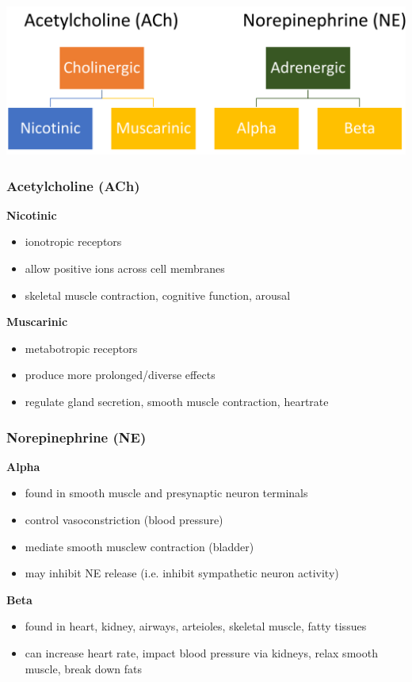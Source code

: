 \documentclass[11pt,fleqn]{book} %
\begin{document}
\begin{center}
    \includegraphics[width=0.65\linewidth]{Pictures/Screenshot 2024-03-06 204921.png}
\end{center}

\subsubsection{Acetylcholine (ACh)}

\textbf{Nicotinic}
\begin{itemize}
    \item ionotropic receptors
    \item allow positive ions across cell membranes 
    \item skeletal muscle contraction, cognitive function, arousal
\end{itemize}

\textbf{Muscarinic}
\begin{itemize}
    \item metabotropic receptors
    \item produce more prolonged/diverse effects
    \item regulate gland secretion, smooth muscle contraction, heartrate
\end{itemize}

\subsubsection{Norepinephrine (NE)}

\textbf{Alpha}
\begin{itemize}
    \item found in smooth muscle and presynaptic neuron terminals
    \item control vasoconstriction (blood pressure)
    \item mediate smooth musclew contraction (bladder)
    \item may inhibit NE release (i.e. inhibit sympathetic neuron activity)
\end{itemize}

\textbf{Beta}
\begin{itemize}
    \item found in heart, kidney, airways, arteioles, skeletal muscle, fatty tissues
    \item can increase heart rate, impact blood pressure via kidneys, relax smooth muscle, break down fats
\end{itemize}
\end{document}
